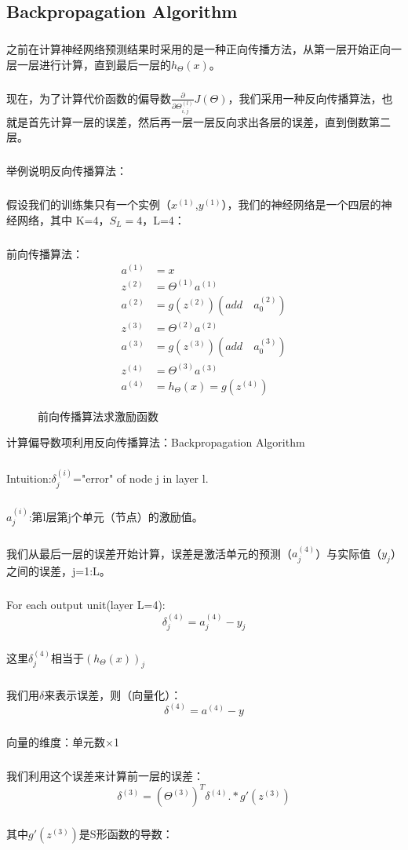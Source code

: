 \documentclass{article}
\begin{document}
\begin{CJK}{UTF8}{gbsn}
\subsection{Backpropagation Algorithm}
\subparagraph{}
之前在计算神经网络预测结果时采用的是一种正向传播方法，从第一层开始正向一层一层进行计算，直到最后一层的$h_\Theta(x)$。
\subparagraph{}
现在，为了计算代价函数的偏导数$\frac{\partial}{\partial\Theta_{i,j}^{(l)}}J(\Theta)$，我们采用一种反向传播算法，也就是首先计算一层的误差，然后再一层一层反向求出各层的误差，直到倒数第二层。
\subparagraph{}
举例说明反向传播算法：
\subparagraph{}
假设我们的训练集只有一个实例（$x^{(1)}$,$y^{(1)}$），我们的神经网络是一个四层的神经网络，其中 K=4，$S_L=4$，L=4：
\subparagraph{}
前向传播算法：
\begin{align}
a^{(1)} & =x \\
z^{(2)} & =\Theta^{(1)}a^{(1)} \\
a^{(2)} & =g(z^{(2)})(add\quad{a_0^{(2)}}) \\
z^{(3)} & =\Theta^{(2)}a^{(2)} \\
a^{(3)} & =g(z^{(3)})(add\quad{a_0^{(3)}}) \\
z^{(4)} & =\Theta^{(3)}a^{(3)} \\
a^{(4)} & =h_\Theta(x)=g(z^{(4)})
\end{align}
\begin{figure}[H]
\caption{前向传播算法求激励函数}
\label{fig:504}
\end{figure}
计算偏导数项利用反向传播算法：Backpropagation Algorithm
\subparagraph{}
Intuition:$\delta_j^{(i)}$="error" of node j in layer l.
\subparagraph{}
$a_j^{(i)}$:第l层第j个单元（节点）的激励值。
\subparagraph{}
我们从最后一层的误差开始计算，误差是激活单元的预测（$a_j^{(4)}$）与实际值（$y_j$）之间的误差，j=1:L。
\subparagraph{}
For each output unit(layer L=4):
\begin{equation}
\delta_j^{(4)}=a_j^{(4)}-y_j
\end{equation}
\subparagraph{}
这里$\delta_j^{(4)}$相当于$(h_\Theta(x))_j$
\subparagraph{}
我们用$\delta$来表示误差，则（向量化）：
\begin{equation}
\delta^{(4)}=a^{(4)}-y
\end{equation}
\subparagraph{}
向量的维度：单元数×1
\subparagraph{}
我们利用这个误差来计算前一层的误差：
\begin{equation}
\delta^{(3)}=(\Theta^{(3)})^T\delta^{(4)}.*g'(z^{(3)})
\end{equation}
\subparagraph{}
其中$g'(z^{(3)})$是S形函数的导数：

\end{CJK}
\end{document}
